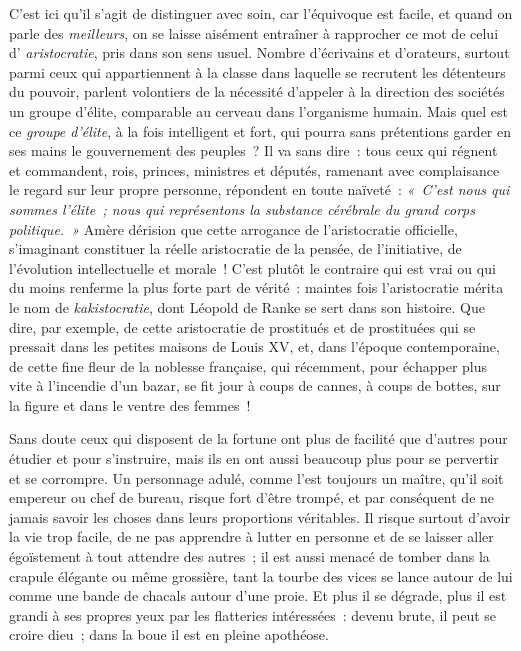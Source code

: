 \documentclass[french,twoside]{book} %
\begin{document}
 C’est ici qu’il s’agit de distinguer avec soin, car l’équivoque est facile, et quand on parle des \emph{meilleurs}, on se laisse aisément entraîner à rapprocher ce mot de celui d’ \emph{aristocratie}, pris dans son sens usuel. Nombre d’écrivains et d’orateurs, surtout parmi ceux qui appartiennent à la classe dans laquelle se recrutent les détenteurs du pouvoir, parlent volontiers de la nécessité d’appeler à la direction des sociétés un groupe d’élite, comparable au cerveau dans l’organisme humain. Mais quel est ce \emph{groupe d’élite}, à la fois intelligent et fort, qui pourra sans prétentions garder en ses mains le gouvernement des peuples ? Il va sans dire : tous ceux qui régnent et commandent, rois, princes, ministres et députés, ramenant  avec complaisance le regard sur leur propre personne, répondent en toute naïveté : \emph{« C’est nous qui sommes l’élite ; nous qui représentons la substance cérébrale du grand corps politique. »} Amère dérision que cette arrogance de l’aristocratie officielle, s’imaginant constituer la réelle aristocratie de la pensée, de l’initiative, de l’évolution intellectuelle et morale ! C’est plutôt le contraire qui est vrai ou qui du moins renferme la plus forte part de vérité : maintes fois l’aristocratie mérita le nom de \emph{kakistocratie}, dont Léopold de Ranke se sert dans son histoire. Que dire, par exemple, de cette aristocratie de prostitués et de prostituées qui se pressait dans les petites maisons de Louis XV, et, dans l’époque contemporaine, de cette fine fleur de la  noblesse française, qui récemment, pour échapper plus vite à l’incendie d’un bazar, se fit jour à coups de cannes, à coups de bottes, sur la figure et dans le ventre des femmes !\par
Sans doute ceux qui disposent de la fortune ont plus de facilité que d’autres pour étudier et pour s’instruire, mais ils en ont aussi beaucoup plus pour se pervertir et se corrompre. Un personnage adulé, comme l’est toujours un maître, qu’il soit empereur ou chef de bureau, risque fort d’être trompé, et par conséquent de ne jamais savoir les choses dans leurs proportions véritables. Il risque surtout d’avoir la vie trop facile, de ne pas apprendre à lutter en personne et de se laisser aller égoïstement à tout attendre des autres ; il est  aussi menacé de tomber dans la crapule élégante ou même grossière, tant la tourbe des vices se lance autour de lui comme une bande de chacals autour d’une proie. Et plus il se dégrade, plus il est grandi à ses propres yeux par les flatteries intéressées : devenu brute, il peut se croire dieu ; dans la boue il est en pleine apothéose.\par
\end{document}
